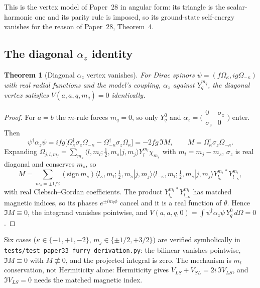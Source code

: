 \documentclass[11pt]{article}
\newtheorem{theorem}{Theorem}
\begin{document}
This is the vertex model of Paper~28 in angular form: its
triangle is the scalar-harmonic one and its parity rule is imposed, so
its ground-state self-energy vanishes for the reason of Paper~28,
Theorem~4.

\subsection{The diagonal $\alpha_z$ identity}

\begin{theorem}[Diagonal $\alpha_z$ vertex vanishes]
\label{thm:alpha_z}
For Dirac spinors $\psi = (f \Omega_\kappa, i g \Omega_{-\kappa})$ with
real radial functions and the model's coupling, $\alpha_z$ against
$Y_q^{m_q}$, the diagonal vertex satisfies $V(a, a, q, m_q) = 0$
identically.
\end{theorem}

\begin{proof}
For $a = b$ the $m$-rule forces $m_q = 0$, so only $Y_q^0$ and
$\alpha_z = \bigl(\begin{smallmatrix} 0 & \sigma_z \\ \sigma_z & 0
\end{smallmatrix}\bigr)$ enter.  Then
\[
  \psi^\dagger \alpha_z \psi
  = i fg \bigl[\Omega_\kappa^\dagger \sigma_z \Omega_{-\kappa}
    - \Omega_{-\kappa}^\dagger \sigma_z \Omega_\kappa\bigr]
  = -2 fg\, \Im M, \qquad
  M = \Omega_\kappa^\dagger \sigma_z \Omega_{-\kappa}.
\]
Expanding $\Omega_{j,l,m_j} = \sum_{m_s}
\langle l, m_l; \tfrac12, m_s | j, m_j \rangle Y_l^{m_l} \chi_{m_s}$
with $m_l = m_j - m_s$, $\sigma_z$ is real diagonal and conserves $m_s$,
so
\[
   M = \sum_{m_s = \pm 1/2} (\mathrm{sign}\,m_s)
     \langle l_\kappa, m_l; \tfrac{1}{2}, m_s | j, m_j \rangle
     \langle l_{-\kappa}, m_l; \tfrac{1}{2}, m_s | j, m_j \rangle
     Y_{l_\kappa}^{m_l\,*} Y_{l_{-\kappa}}^{m_l},
\]
with real Clebsch--Gordan coefficients.  The product
$Y_{l_\kappa}^{m_l\,*} Y_{l_{-\kappa}}^{m_l}$ has matched magnetic indices,
so its phases $e^{\pm i m_l \phi}$ cancel and it is a real function of
$\theta$.  Hence $\Im M \equiv 0$, the integrand vanishes pointwise, and
$V(a, a, q, 0) = \int \psi^\dagger \alpha_z \psi\, Y_q^0\, d\Omega = 0$.
\end{proof}

Six cases ($\kappa \in \{-1, +1, -2\}$, $m_j \in \{\pm 1/2, +3/2\}$) are
verified symbolically in \texttt{tests/test\_paper33\_furry\_derivation.py}:
the bilinear vanishes pointwise, $\Im M \equiv 0$ with $M \not\equiv 0$,
and the projected integral is zero.  The mechanism is $m_l$
conservation, not Hermiticity alone: Hermiticity gives
$V_{LS} + V_{SL} = 2i\,\Im V_{LS}$, and $\Im V_{LS} = 0$ needs the
matched magnetic index.
\end{document}
